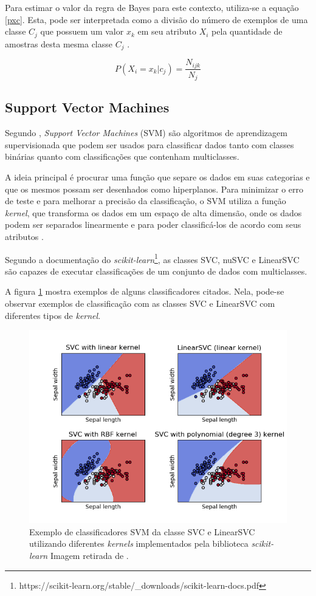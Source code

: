 \documentclass[12pt]{article}
\begin{document}
        Para estimar o valor da regra de Bayes para este contexto, utiliza-se a equação \ref{pxc}. Esta, pode ser interpretada como a divisão do número de exemplos de uma classe $C_j$ que possuem um valor $x_k$ em seu atributo $X_i$ pela quantidade de amostras desta mesma classe $C_j$ \cite{bnc}.
        
        \begin{equation}\label{pxc}
           P(X_i = x_k | c_j) = \frac{N_{ijk}}{N_j}
        \end{equation}
        
    \subsection{Support Vector Machines}
    
    Segundo \cite{bohra}, \textit{Support Vector Machines} (SVM) são algoritmos de aprendizagem supervisionada que podem ser usados para classificar dados tanto com classes binárias quanto com classificações que contenham multiclasses. 
    
    A ideia principal é procurar uma função que separe os dados em suas categorias e que os mesmos possam ser desenhados como hiperplanos.
    Para minimizar o erro de teste e para melhorar a precisão da classificação, o SVM utiliza a função \textit{kernel}, que transforma os dados em um espaço de alta dimensão, onde os dados podem ser separados linearmente e para poder classificá-los de acordo com seus atributos \cite{bohra}.
    
    Segundo a documentação do \textit{scikit-learn}\footnote{https://scikit-learn.org/stable/\_downloads/scikit-learn-docs.pdf}, as classes SVC, nuSVC e LinearSVC são capazes de executar classificações de um conjunto de dados com multiclasses.
    
    A figura \ref{fig:svm} mostra exemplos de alguns classificadores citados. Nela, pode-se observar exemplos de classificação com as classes SVC e LinearSVC com diferentes tipos de \textit{kernel}. 
    
    \begin{figure}[h]
        \centering
        \includegraphics[width=.85\textwidth]{svc.png}
        \caption{Exemplo de classificadores SVM da classe SVC e LinearSVC utilizando diferentes \textit{kernels} implementados pela biblioteca \textit{scikit-learn} Imagem retirada de \cite{scikit-learn}.}
        \label{fig:svm}
    \end{figure}
    
\end{document}
